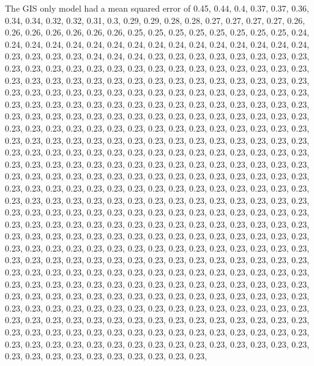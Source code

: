\documentclass[11pt,]{article}
\begin{document}
The GIS only model had a mean squared error of 0.45, 0.44, 0.4, 0.37,
0.37, 0.36, 0.34, 0.34, 0.32, 0.32, 0.31, 0.3, 0.29, 0.29, 0.28, 0.28,
0.27, 0.27, 0.27, 0.27, 0.26, 0.26, 0.26, 0.26, 0.26, 0.26, 0.26, 0.25,
0.25, 0.25, 0.25, 0.25, 0.25, 0.25, 0.25, 0.24, 0.24, 0.24, 0.24, 0.24,
0.24, 0.24, 0.24, 0.24, 0.24, 0.24, 0.24, 0.24, 0.24, 0.24, 0.24, 0.23,
0.23, 0.23, 0.23, 0.24, 0.24, 0.24, 0.23, 0.23, 0.23, 0.23, 0.23, 0.23,
0.23, 0.23, 0.23, 0.23, 0.23, 0.23, 0.23, 0.23, 0.23, 0.23, 0.23, 0.23,
0.23, 0.23, 0.23, 0.23, 0.23, 0.23, 0.23, 0.23, 0.23, 0.23, 0.23, 0.23,
0.23, 0.23, 0.23, 0.23, 0.23, 0.23, 0.23, 0.23, 0.23, 0.23, 0.23, 0.23,
0.23, 0.23, 0.23, 0.23, 0.23, 0.23, 0.23, 0.23, 0.23, 0.23, 0.23, 0.23,
0.23, 0.23, 0.23, 0.23, 0.23, 0.23, 0.23, 0.23, 0.23, 0.23, 0.23, 0.23,
0.23, 0.23, 0.23, 0.23, 0.23, 0.23, 0.23, 0.23, 0.23, 0.23, 0.23, 0.23,
0.23, 0.23, 0.23, 0.23, 0.23, 0.23, 0.23, 0.23, 0.23, 0.23, 0.23, 0.23,
0.23, 0.23, 0.23, 0.23, 0.23, 0.23, 0.23, 0.23, 0.23, 0.23, 0.23, 0.23,
0.23, 0.23, 0.23, 0.23, 0.23, 0.23, 0.23, 0.23, 0.23, 0.23, 0.23, 0.23,
0.23, 0.23, 0.23, 0.23, 0.23, 0.23, 0.23, 0.23, 0.23, 0.23, 0.23, 0.23,
0.23, 0.23, 0.23, 0.23, 0.23, 0.23, 0.23, 0.23, 0.23, 0.23, 0.23, 0.23,
0.23, 0.23, 0.23, 0.23, 0.23, 0.23, 0.23, 0.23, 0.23, 0.23, 0.23, 0.23,
0.23, 0.23, 0.23, 0.23, 0.23, 0.23, 0.23, 0.23, 0.23, 0.23, 0.23, 0.23,
0.23, 0.23, 0.23, 0.23, 0.23, 0.23, 0.23, 0.23, 0.23, 0.23, 0.23, 0.23,
0.23, 0.23, 0.23, 0.23, 0.23, 0.23, 0.23, 0.23, 0.23, 0.23, 0.23, 0.23,
0.23, 0.23, 0.23, 0.23, 0.23, 0.23, 0.23, 0.23, 0.23, 0.23, 0.23, 0.23,
0.23, 0.23, 0.23, 0.23, 0.23, 0.23, 0.23, 0.23, 0.23, 0.23, 0.23, 0.23,
0.23, 0.23, 0.23, 0.23, 0.23, 0.23, 0.23, 0.23, 0.23, 0.23, 0.23, 0.23,
0.23, 0.23, 0.23, 0.23, 0.23, 0.23, 0.23, 0.23, 0.23, 0.23, 0.23, 0.23,
0.23, 0.23, 0.23, 0.23, 0.23, 0.23, 0.23, 0.23, 0.23, 0.23, 0.23, 0.23,
0.23, 0.23, 0.23, 0.23, 0.23, 0.23, 0.23, 0.23, 0.23, 0.23, 0.23, 0.23,
0.23, 0.23, 0.23, 0.23, 0.23, 0.23, 0.23, 0.23, 0.23, 0.23, 0.23, 0.23,
0.23, 0.23, 0.23, 0.23, 0.23, 0.23, 0.23, 0.23, 0.23, 0.23, 0.23, 0.23,
0.23, 0.23, 0.23, 0.23, 0.23, 0.23, 0.23, 0.23, 0.23, 0.23, 0.23, 0.23,
0.23, 0.23, 0.23, 0.23, 0.23, 0.23, 0.23, 0.23, 0.23, 0.23, 0.23, 0.23,
0.23, 0.23, 0.23, 0.23, 0.23, 0.23, 0.23, 0.23, 0.23, 0.23, 0.23, 0.23,
0.23, 0.23, 0.23, 0.23, 0.23, 0.23, 0.23, 0.23, 0.23, 0.23, 0.23, 0.23,
0.23, 0.23, 0.23, 0.23, 0.23, 0.23, 0.23, 0.23, 0.23, 0.23, 0.23, 0.23,
0.23, 0.23, 0.23, 0.23, 0.23, 0.23, 0.23, 0.23, 0.23, 0.23, 0.23, 0.23,
0.23, 0.23, 0.23, 0.23, 0.23, 0.23, 0.23, 0.23, 0.23, 0.23, 0.23, 0.23,
0.23, 0.23, 0.23, 0.23, 0.23, 0.23, 0.23, 0.23, 0.23, 0.23, 0.23, 0.23,
\end{document}
